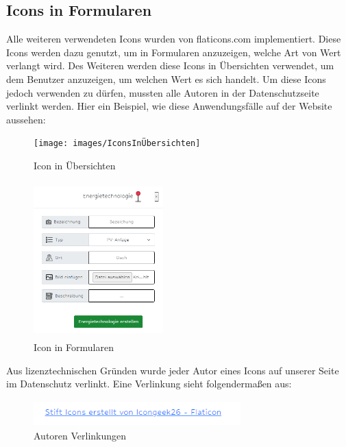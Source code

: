 \subsection{Icons in Formularen}\label{sec: Icons in Formularen}
Alle weiteren verwendeten Icons wurden von flaticons.com implementiert. Diese Icons werden dazu genutzt, um in Formularen anzuzeigen, welche Art von Wert verlangt wird. Des Weiteren werden diese Icons in Übersichten verwendet, um dem Benutzer anzuzeigen, um welchen Wert es sich handelt. Um diese Icons jedoch verwenden zu dürfen, mussten alle Autoren in der Datenschutzseite verlinkt werden. Hier ein Beispiel, wie diese Anwendungsfälle auf der Website aussehen:
\begin{figure}[h]
	\centering
	\texttt{[image: images/IconsInÜbersichten]}
	\caption{Icon in Übersichten}
	\label{fig: Icons in Übersichten}
\end{figure}
\newpage
\begin{figure}[h]
	\centering
	\includegraphics[height=6cm,width=5cm]{images/IconsInFormularen}
	\caption{Icon in Formularen}
	\label{fig: Icons in Formularen}
\end{figure}
Aus lizenztechnischen Gründen wurde jeder Autor eines Icons auf unserer Seite im Datenschutz verlinkt. Eine Verlinkung sieht folgendermaßen aus:
\begin{figure}[h]
	\centering
	\includegraphics[height=1cm,width=8cm]{images/IconAutorVerlinkungen}
	\caption{Autoren Verlinkungen}
	\label{fig: Autoren Verlinkungen}
\end{figure}


